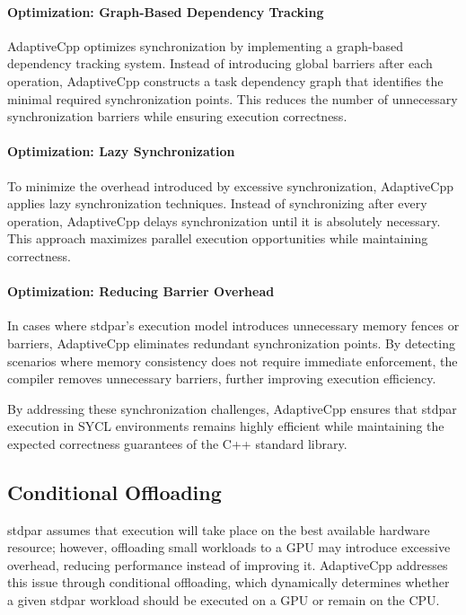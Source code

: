 \paragraph{Optimization: Graph-Based Dependency Tracking}
AdaptiveCpp optimizes synchronization by implementing a graph-based dependency tracking system. Instead of
introducing global barriers after each operation, AdaptiveCpp constructs a task dependency graph that identifies
the minimal required synchronization points. This reduces the number of unnecessary synchronization barriers
while ensuring execution correctness.

\paragraph{Optimization: Lazy Synchronization}
To minimize the overhead introduced by excessive synchronization, AdaptiveCpp applies lazy synchronization
techniques. Instead of synchronizing after every operation, AdaptiveCpp delays synchronization until it is
absolutely necessary. This approach maximizes parallel execution opportunities while maintaining correctness.

\paragraph{Optimization: Reducing Barrier Overhead}
In cases where stdpar’s execution model introduces unnecessary memory fences or barriers, AdaptiveCpp
eliminates redundant synchronization points. By detecting scenarios where memory consistency does not require
immediate enforcement, the compiler removes unnecessary barriers, further improving execution efficiency.

By addressing these synchronization challenges, AdaptiveCpp ensures that stdpar execution in SYCL environments
remains highly efficient while maintaining the expected correctness guarantees of the C++ standard library.

\subsection{Conditional Offloading}
\label{sec:conditional_offloading}

stdpar assumes that execution will take place on the best available hardware resource; however, offloading small
workloads to a GPU may introduce excessive overhead, reducing performance instead of improving it. AdaptiveCpp
addresses this issue through conditional offloading, which dynamically determines whether a given stdpar workload
should be executed on a GPU or remain on the CPU.

